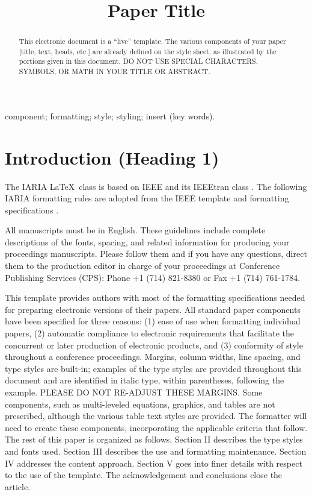 \documentclass[conference,pbalance]{iaria}
\title{Paper Title}
\author{
    \IEEEauthorblockN{Authors Name/s per 1st Affiliation \emph{(Author)}}
    \IEEEauthorblockA{%
        line 1 (of Affiliation): dept.\ name of organization\\
        line 2: name of organization, acronyms acceptable\\
        line 3: City, Country\\
        line 4: e-mail: {\tt name@xyz.com}
    }
}
\begin{document}
\maketitle

\begin{abstract}
This electronic document is a “live” template. The various components of your paper [title, text, heads, etc.] are already defined on the style sheet, as illustrated by the portions given in this document. DO NOT USE SPECIAL CHARACTERS, SYMBOLS, OR MATH IN YOUR TITLE OR ABSTRACT.
\end{abstract}

\begin{IEEEkeywords}
component; formatting; style; styling; insert (key words).
\end{IEEEkeywords}

\section{Introduction (Heading 1)}

The IARIA \LaTeX\ class is based on IEEE and its IEEEtran class \cite{ieee2015howto}.
The following IARIA formatting rules are adopted from the IEEE template and formatting specifications \cite{ieee2018formattingrules}.

All manuscripts must be in English. These guidelines include complete descriptions of the fonts, spacing, and related information for producing your proceedings manuscripts. Please follow them and if you have any questions, direct them to the production editor in charge of your proceedings at Conference Publishing Services (CPS): Phone +1 (714) 821-8380 or Fax +1 (714) 761-1784.

This template provides authors with most of the formatting specifications needed for preparing electronic versions of their papers. All standard paper components have been specified for three reasons: (1) ease of use when formatting individual papers, (2) automatic compliance to electronic requirements that facilitate the concurrent or later production of electronic products, and (3) conformity of style throughout a conference proceedings. Margins, column widths, line spacing, and type styles are built-in; examples of the type styles are provided throughout this document and are identified in italic type, within parentheses, following the example. PLEASE DO NOT RE-ADJUST THESE MARGINS. Some components, such as multi-leveled equations, graphics, and tables are not prescribed, although the various table text styles are provided. The formatter will need to create these components, incorporating the applicable criteria that follow. The rest of this paper is organized as follows. Section II describes the type styles and fonts used. Section III describes the use and formatting maintenance. Section IV addresses the content approach. Section V goes into finer details with respect to the use of the template.  The acknowledgement and conclusions close the article.
\end{document}
